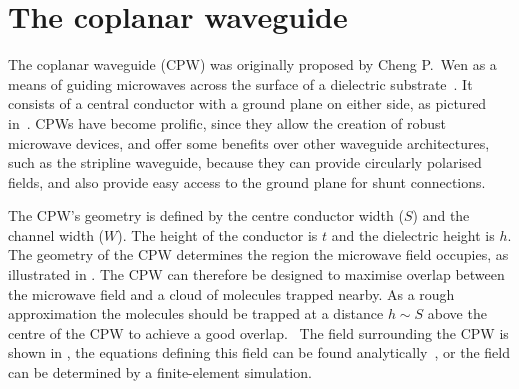
\section{The coplanar waveguide}

The coplanar waveguide (CPW) was originally proposed by Cheng P.~Wen as a means
of guiding microwaves across the surface of a dielectric
substrate~\cite{1127105}. It consists of a central conductor with a ground
plane on either side, as pictured in~. CPWs have become
prolific, since they allow the creation of robust microwave devices, and offer
some benefits over other waveguide architectures, such as the stripline
waveguide, because they can provide circularly polarised fields, and also
provide easy access to the ground plane for shunt connections.

The CPW's geometry is defined by the centre conductor width ($S$) and the
channel width ($W$). The height of the conductor is $t$ and the dielectric
height is $h$.  The geometry of the CPW determines the region the microwave
field occupies, as illustrated in .  The CPW
can therefore be designed to maximise overlap between the microwave field and a
cloud of molecules trapped nearby.  As a rough approximation the molecules
should be trapped at a distance $h\sim S$ above the centre of the CPW to
achieve a good overlap.~\cite{Boehi2009} The field surrounding the CPW is shown
in , the equations defining this field can be found
analytically~\cite{Simons2004}, or the field can be determined by a
finite-element simulation.

